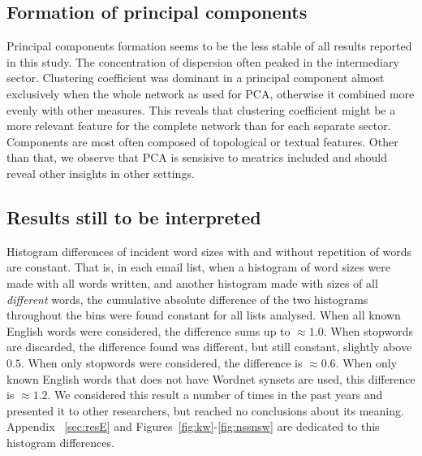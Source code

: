 \subsection{Formation of principal components}\label{subsec:pc}
% 



Principal components formation seems to be the less stable of all results reported in this study.
The concentration of dispersion often peaked in the intermediary sector.
Clustering coefficient was dominant in a principal component almost exclusively
when the whole network as used for PCA, otherwise it combined more evenly with
other measures.
This reveals that clustering coefficient might be a more relevant feature for the complete network
than for each separate sector.
Components are most often composed of topological or textual features.
Other than that, we observe that PCA is sensisive to meatrics included
and should reveal other insights in other settings.

\subsection{Results still to be interpreted}\label{subsec:sii}
Histogram differences of incident word sizes with and without repetition of words are constant.
That is, in each email list, when a histogram of word sizes were made with all words written,
and another histogram made with sizes of all \emph{different} words,
the cumulative absolute difference of the two histograms throughout the bins were found constant for all lists analysed.
When all known English words were considered, 
the difference sums up to $\approx 1.0$.
When stopwords are discarded,
the difference found was different, but still constant, slightly above $0.5$.
When only stopwords were considered, the difference is $\approx 0.6$.
When only known English words that does not have Wordnet synsets are used,
this difference is $\approx 1.2$.
We considered this result a number of times in the past years and presented it to other researchers,
but reached no conclusions about its meaning.
Appendix ~\ref{sec:resE} and Figures~\ref{fig:kw}-\ref{fig:nssnsw} are dedicated to this histogram differences.

